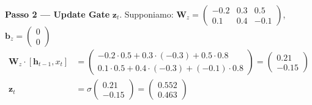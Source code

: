 \documentclass[12pt,a4paper]{article}
\begin{document}
\begin{examplebox}
\textbf{Passo 2 --- Update Gate} $\mathbf{z}_t$. Supponiamo:
$\mathbf{W}_z = \begin{pmatrix} -0.2 & 0.3 & 0.5 \\ 0.1 & 0.4 & -0.1 \end{pmatrix}$, $\mathbf{b}_z = \begin{pmatrix} 0 \\ 0 \end{pmatrix}$
\begin{align*}
    \mathbf{W}_z \cdot [\mathbf{h}_{t-1}, x_t] &= \begin{pmatrix} -0.2 \cdot 0.5 + 0.3 \cdot (-0.3) + 0.5 \cdot 0.8 \\ 0.1 \cdot 0.5 + 0.4 \cdot (-0.3) + (-0.1) \cdot 0.8 \end{pmatrix} = \begin{pmatrix} 0.21 \\ -0.15 \end{pmatrix} \\
    \mathbf{z}_t &= \sigma\!\begin{pmatrix} 0.21 \\ -0.15 \end{pmatrix} = \begin{pmatrix} 0.552 \\ 0.463 \end{pmatrix}
\end{align*}


\end{examplebox}
\end{document}
